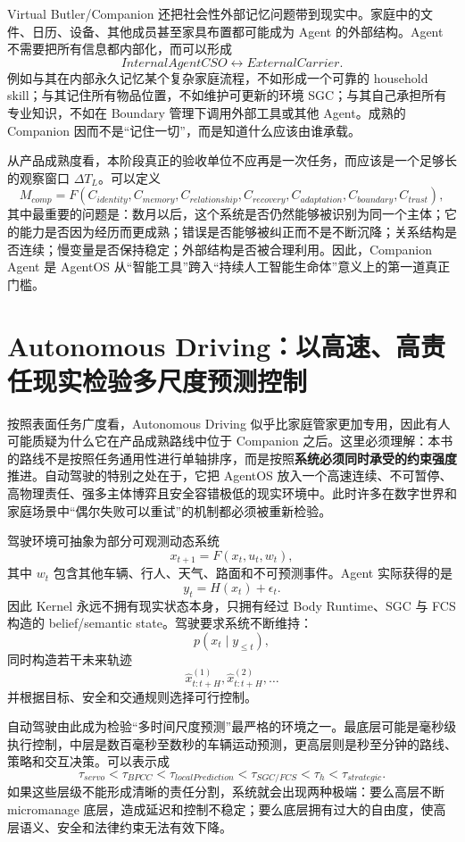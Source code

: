 Virtual Butler/Companion 还把社会性外部记忆问题带到现实中。家庭中的文件、日历、设备、其他成员甚至家具布置都可能成为 Agent 的外部结构。Agent 不需要把所有信息都内部化，而可以形成
\[
InternalAgentCSO
\leftrightarrow
ExternalCarrier.
\]
例如与其在内部永久记忆某个复杂家庭流程，不如形成一个可靠的 household skill；与其记住所有物品位置，不如维护可更新的环境 SGC；与其自己承担所有专业知识，不如在 Boundary 管理下调用外部工具或其他 Agent。成熟的 Companion 因而不是“记住一切”，而是知道什么应该由谁承载。

从产品成熟度看，本阶段真正的验收单位不应再是一次任务，而应该是一个足够长的观察窗口 $\Delta T_L$。可以定义
\[
M_{comp}
=
F(
C_{identity},
C_{memory},
C_{relationship},
C_{recovery},
C_{adaptation},
C_{boundary},
C_{trust}
),
\]
其中最重要的问题是：数月以后，这个系统是否仍然能够被识别为同一个主体；它的能力是否因为经历而更成熟；错误是否能够被纠正而不是不断沉降；关系结构是否连续；慢变量是否保持稳定；外部结构是否被合理利用。因此，Companion Agent 是 AgentOS 从“智能工具”跨入“持续人工智能生命体”意义上的第一道真正门槛。

\section{Autonomous Driving：以高速、高责任现实检验多尺度预测控制}

按照表面任务广度看，Autonomous Driving 似乎比家庭管家更加专用，因此有人可能质疑为什么它在产品成熟路线中位于 Companion 之后。这里必须理解：本书的路线不是按照任务通用性进行单轴排序，而是按照\textbf{系统必须同时承受的约束强度}推进。自动驾驶的特别之处在于，它把 AgentOS 放入一个高速连续、不可暂停、高物理责任、强多主体博弈且安全容错极低的现实环境中。此时许多在数字世界和家庭场景中“偶尔失败可以重试”的机制都必须被重新检验。

驾驶环境可抽象为部分可观测动态系统
\[
x_{t+1}
=
F(x_t,u_t,w_t),
\]
其中 $w_t$ 包含其他车辆、行人、天气、路面和不可预测事件。Agent 实际获得的是
\[
y_t
=
H(x_t)+\epsilon_t.
\]
因此 Kernel 永远不拥有现实状态本身，只拥有经过 Body Runtime、SGC 与 FCS 构造的 belief/semantic state。驾驶要求系统不断维持：
\[
p(x_t\mid y_{\leq t}),
\]
同时构造若干未来轨迹
\[
\hat{x}_{t:t+H}^{(1)},
\hat{x}_{t:t+H}^{(2)},\ldots
\]
并根据目标、安全和交通规则选择可行控制。

自动驾驶由此成为检验“多时间尺度预测”最严格的环境之一。最底层可能是毫秒级执行控制，中层是数百毫秒至数秒的车辆运动预测，更高层则是秒至分钟的路线、策略和交互决策。可以表示成
\[
\tau_{servo}
<
\tau_{BPCC}
<
\tau_{localPrediction}
<
\tau_{SGC/FCS}
<
\tau_h
<
\tau_{strategic}.
\]
如果这些层级不能形成清晰的责任分割，系统就会出现两种极端：要么高层不断 micromanage 底层，造成延迟和控制不稳定；要么底层拥有过大的自由度，使高层语义、安全和法律约束无法有效下降。

